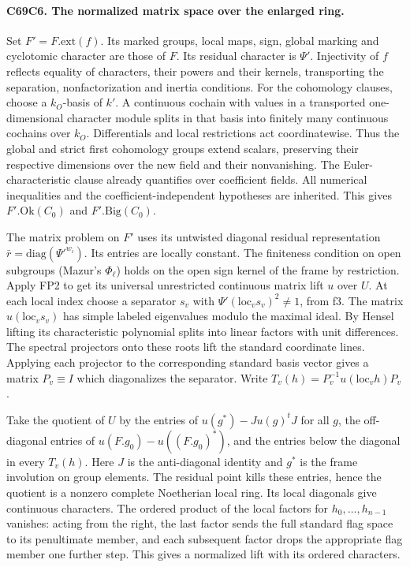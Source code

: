\paragraph{C69C6. The normalized matrix space over the enlarged ring.}
Set $F'=F.\mathrm{ext}(f)$. Its marked groups, local maps, sign,
global marking and cyclotomic character are those of $F$. Its
residual character is $\Psi'$. Injectivity of $f$ reflects equality
of characters, their powers and their kernels, transporting the
separation, nonfactorization and inertia conditions. For the
cohomology clauses, choose a $k_O$-basis of $k'$. A continuous
cochain with values in a transported one-dimensional character
module splits in that basis into finitely many continuous cochains
over $k_O$. Differentials and local restrictions act coordinatewise.
Thus the global and strict first cohomology groups extend scalars,
preserving their respective dimensions over the new field and their
nonvanishing. The Euler-characteristic clause already quantifies
over coefficient fields. All numerical inequalities and the
coefficient-independent hypotheses are inherited. This gives
$F'.\mathrm{Ok}(C_0)$ and $F'.\mathrm{Big}(C_0)$.

The matrix problem on $F'$ uses its untwisted diagonal residual
representation $\bar r=\mathrm{diag}(\Psi'^{w_i})$. Its entries are
locally constant. The finiteness condition on open subgroups
(Mazur's $\Phi_\ell$) holds on the open sign kernel of the frame
by restriction. Apply FP2 to get its universal unrestricted
continuous matrix lift $u$ over $U$. At each local index choose a
separator $s_v$ with $\Psi'(\mathrm{loc}_v s_v)^2\ne1$, from f3.
The matrix $u(\mathrm{loc}_v s_v)$ has simple labeled eigenvalues
modulo the maximal ideal. By Hensel lifting its characteristic
polynomial splits into linear factors with unit differences.
The spectral projectors onto these roots lift the standard
coordinate lines. Applying each projector to the corresponding
standard basis vector gives a matrix $P_v\equiv I$ which
diagonalizes the separator. Write
$T_v(h)=P_v^{-1}u(\mathrm{loc}_v h)P_v$.

Take the quotient of $U$ by the entries of
$u(g^*)-Ju(g)^tJ$ for all $g$, the off-diagonal entries of
$u(F.g_0)-u((F.g_0)^*)$, and the entries below the diagonal in
every $T_v(h)$. Here $J$ is the anti-diagonal identity and $g^*$
is the frame involution on group elements. The residual point kills
these entries, hence the quotient is a nonzero complete Noetherian
local ring. Its local diagonals give continuous characters. The
ordered product of the local factors for $h_0,\ldots,h_{n-1}$
vanishes: acting from the right, the last factor sends the full
standard flag space to its penultimate member, and each subsequent
factor drops the appropriate flag member one further step. This
gives a normalized lift with its ordered characters.

